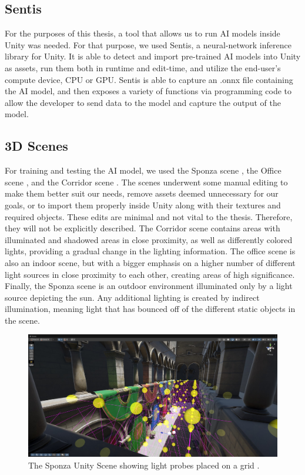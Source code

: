 \subsection{Sentis}
For the purposes of this thesis, a tool that allows us to run AI models inside Unity was needed. For that purpose, we used Sentis, a neural-network inference library for Unity. It is able to detect and import pre-trained AI models into Unity as assets, run them both in runtime and edit-time, and utilize the end-user's compute device, CPU or GPU. Sentis is able to capture an .onnx file containing the AI model, and then exposes a variety of functions via programming code to allow the developer to send data to the model and capture the output of the model.

\subsection{3D Scenes}
For training and testing the AI model, we used the Sponza scene \parencite{Sponza2017}, the Office scene \parencite{Office2021}, and the Corridor scene \parencite{Corridor2021}. The scenes underwent some manual editing to make them better suit our needs, remove assets deemed unnecessary for our goals, or to import them properly inside Unity along with their textures and required objects. These edits are minimal and not vital to the thesis. Therefore, they will not be explicitly described. The Corridor scene contains areas with illuminated and shadowed areas in close proximity, as well as differently colored lights, providing a gradual change in the lighting information. The office scene is also an indoor scene, but with a bigger emphasis on a higher number of different light sources in close proximity to each other, creating areas of high significance. Finally, the Sponza scene is an outdoor environment illuminated only by a light source depicting the sun. Any additional lighting is created by indirect illumination, meaning light that has bounced off of the different static objects in the scene.

\begin{figure}[h]
	\centering
	\includegraphics[width=\linewidth]{Graphics/Sponza_lightprobes.jpg}
	\caption{The Sponza Unity Scene showing light probes placed on a grid \parencite{Sponza2017}.}
	\label{fig:Sponza_lp}
\end{figure}


